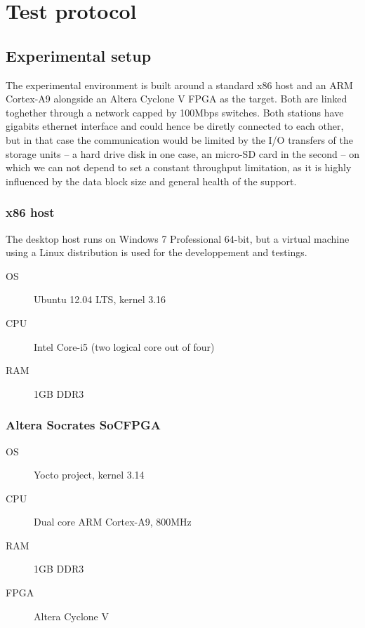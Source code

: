 \chapter{Test protocol}

\section{Experimental setup}
The experimental environment is built around a standard x86 host and an ARM Cortex-A9 alongside an Altera Cyclone V FPGA as the target.
Both are linked toghether through a network capped by 100Mbps switches.
Both stations have gigabits ethernet interface and could hence be diretly connected to each other, but in that case the communication would be limited by the I/O transfers of the storage units -- a hard drive disk in one case, an micro-SD card in the second -- on which we can not depend to set a constant throughput limitation, as it is highly influenced by the data block size and general health of the support.


\subsection{x86 host}
The desktop host runs on Windows 7 Professional 64-bit, but a virtual machine using a Linux distribution is used for the developpement and testings.

\begin{framed}
\begin{description}
	\item[OS] Ubuntu 12.04 LTS, kernel 3.16
	\item[CPU] Intel Core-i5 (two logical core out of four)
	\item[RAM] 1GB DDR3
\end{description}
\end{framed}

\subsection{Altera Socrates SoCFPGA}

\begin{framed}
\begin{description}
	\item[OS] Yocto project, kernel 3.14
	\item[CPU] Dual core ARM Cortex-A9, 800MHz
	\item[RAM] 1GB DDR3
	\item[FPGA] Altera Cyclone V
\end{description}
\end{framed}

